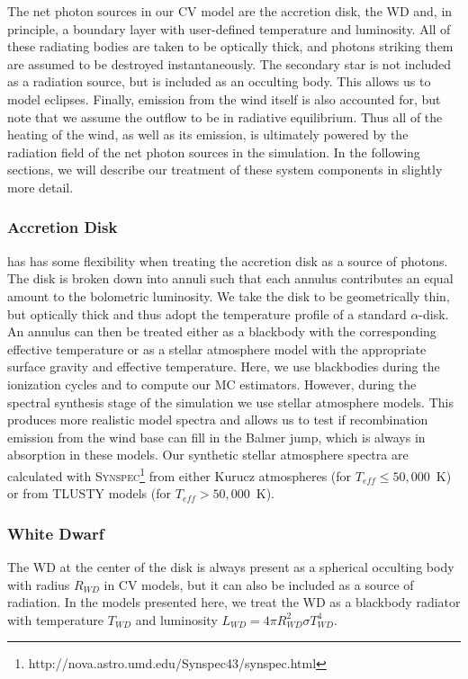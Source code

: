 \documentclass[preprint, a4paper, 11pt]{aastex}
\begin{document}
The net photon sources in our CV model are the accretion disk, the
WD and, in principle, a boundary layer with user-defined temperature
and luminosity. All of these radiating bodies are taken to be
optically thick, and photons striking them are assumed to be destroyed
instantaneously. The secondary star is not included as a radiation
source, but is included as an occulting body. This allows us to model
eclipses. Finally, emission from the wind itself is also accounted for, but
note that we assume the outflow to be in radiative equilibrium. Thus all
of the heating of the wind, as well as its emission, is ultimately
powered by the radiation field of the net photon sources in the
simulation. In the following sections, we will describe our treatment
of these system components in slightly more detail.

\subsubsection{Accretion Disk}

\py has has some flexibility when treating the accretion 
disk as a source of photons. The disk is broken down into annuli 
such that each annulus contributes an equal amount to the bolometric
luminosity. We take the disk to be geometrically thin, but optically
thick and thus adopt the temperature profile of a standard
\cite{shakurasunyaev1973} $\alpha$-disk. An annulus can then
be treated either as a blackbody with the corresponding effective
temperature or as a stellar atmosphere model with the appropriate
surface gravity and effective temperature. Here, we use blackbodies 
during the ionization cycles and to compute our MC
estimators. However, during the spectral synthesis stage of the 
simulation we use stellar atmosphere models. This produces more
realistic model spectra and allows us to test if recombination
emission from the wind base can fill in the Balmer jump, which is
always in absorption in these models. Our synthetic stellar atmosphere
spectra are calculated with
\textsc{Synspec}\footnote{http://nova.astro.umd.edu/Synspec43/synspec.html}
from either Kurucz \citep{kurucz1991} atmospheres (for $T_{eff} \leq
50,000$~K) or from \textsc{TLUSTY} models \citep{tlusty} (for $T_{eff} > 50,000$~K). 

\subsubsection{White Dwarf}

The WD at the center of the disk is always present as a spherical occulting
body with radius $R_{WD}$ in \py CV models, but it can also be included
as a source of radiation. In the models presented here, we treat the
WD as a blackbody radiator with temperature $T_{WD}$ and luminosity
$L_{WD} = 4\pi R_{WD}^2 \sigma T_{WD}^4$. 
\end{document}
